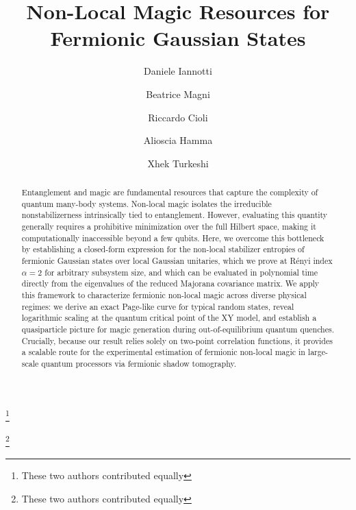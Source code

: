 \documentclass[prx,twocolumn,superscriptaddress,aps,10pt, frontmatterverbose, reprint,footinbib,longbibliography=true]{revtex4-2}
\newcommand{\RENYI}{\alpha}
\begin{document}

\title{Non-Local Magic Resources for Fermionic Gaussian States}

\author{Daniele Iannotti}
\thanks{These two authors contributed equally}



\author{Beatrice Magni}
\thanks{These two authors contributed equally}

\author{Riccardo Cioli}


\author{Alioscia Hamma}


\author{Xhek Turkeshi}


\begin{abstract}
Entanglement and magic are fundamental resources that capture the complexity of quantum many-body systems. Non-local magic isolates the irreducible nonstabilizerness intrinsically tied to entanglement. However, evaluating this quantity generally requires a prohibitive minimization over the full Hilbert space, making it computationally inaccessible beyond a few qubits. Here, we overcome this bottleneck by establishing a closed-form expression for the non-local stabilizer entropies of fermionic Gaussian states over local Gaussian unitaries, which we prove at R\'enyi index $\RENYI=2$ for arbitrary subsystem size, and which can be evaluated in polynomial time directly from the eigenvalues of the reduced Majorana covariance matrix. We apply this framework to characterize fermionic non-local magic across diverse physical regimes: we derive an exact Page-like curve for typical random states, reveal logarithmic scaling at the quantum critical point of the XY model, and establish a quasiparticle picture for magic generation during out-of-equilibrium quantum quenches. Crucially, because our result relies solely on two-point correlation functions, it provides a scalable route for the experimental estimation of fermionic non-local magic in large-scale quantum processors via fermionic shadow tomography.
\end{abstract}
\end{document}
